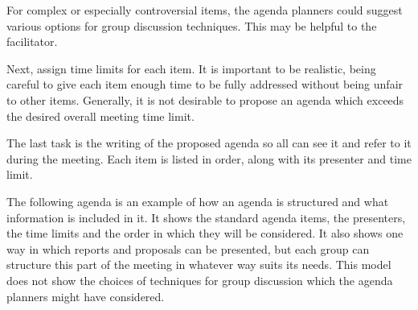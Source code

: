 For complex or especially controversial items, the agenda planners
could suggest various options for group discussion techniques. This
may be helpful to the facilitator.

Next, assign time limits for each item. It is important to be
realistic, being careful to give each item enough time to be fully
addressed without being unfair to other items. Generally, it is not
desirable to propose an agenda which exceeds the desired overall
meeting time limit.

The last task is the writing of the proposed agenda so all can see
it and refer to it during the meeting. Each item is listed in
order, along with its presenter and time limit.

The following agenda is an example of how an agenda is structured
and what information is included in it. It shows the standard
agenda items, the presenters, the time limits and the order in
which they will be considered.  It also shows one way in which
reports and proposals can be presented, but each group can
structure this part of the meeting in whatever way suits its
needs. This model does not show the choices of techniques for
group discussion which the agenda planners might have considered.
\clearpage

